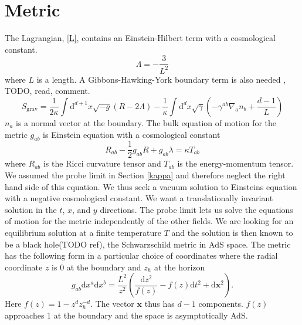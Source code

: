 \documentclass[12pt]{report}
\renewcommand{\d}{\ensuremath{\mathrm{d}}}
\begin{document}
\section{Metric}
The Lagrangian, \eqref{L}, contains an Einstein-Hilbert term with a cosmological constant.
\begin{equation}
\Lambda=-\frac{3}{L^2}
\end{equation}
where $L$ is a length.
A Gibbons-Hawking-York boundary term is also needed \cite{PhysRevD.15.2752}, \cite{PhysRevLett.28.1082} TODO, read, comment.
\begin{equation}
 S_{\mathrm{grav}}=\frac{1}{2\kappa}\int \d^{d+1}x\sqrt{-g}\left(R-2\Lambda\right)-\frac{1}{\kappa}\int \d^dx\sqrt{\gamma}\left(-\gamma^{ab}\nabla_an_b+\frac{d-1}{L}\right)
\end{equation}
$n_a$ is a normal vector at the boundary. The bulk equation of motion for the metric $g_{ab}$ is Einstein equation with a cosmological constant
\begin{equation}
R_{ab}-\frac{1}{2}g_{ab}R+g_{ab}\lambda=\kappa T_{ab}
\end{equation}
where $R_{ab}$ is the Ricci curvature tensor and $T_{ab}$ is the energy-momentum tensor. We assumed the probe limit in Section \ref{kappa} and therefore neglect the right hand side of this equation. We thus seek a vacuum solution to Einsteins equation with a negative cosmological constant. We want a translationally invariant solution in the $t$, $x$, and $y$ directions.
The probe limit lets us solve the equations of motion for the metric independently of the other fields. We are looking for an equilibrium solution at a finite temperature $T$ and the solution is then known to be a black hole(TODO ref), the Schwarzschild metric in AdS space. The metric has the following form in a particular choice of coordinates where the radial coordinate $z$ is 0 at the boundary and $z_h$ at the horizon
\begin{equation}
 g_{ab}\d x^a\d x^b=\frac{L^2}{z^2}\left(\frac{\d z^2}{f(z)}-f(z)\d t^2+\d \mathbf{x}^2\right).\label{metric}
\end{equation}
Here $f(z)=1-z^dz_h^{-d}$. The vector $\mathbf{x}$ thus has $d-1$ components. $f(z)$ approaches 1 at the boundary and the space is asymptotically AdS.\\
\end{document}
